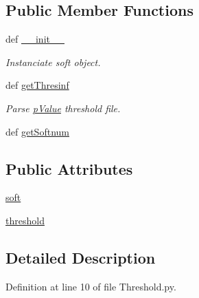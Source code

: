 \subsection*{\-Public \-Member \-Functions}
\begin{DoxyCompactItemize}
\item 
def \hyperlink{classirna_1_1iRNA__stat_1_1Threshold_1_1Threshold_ae922ba006336054553ecaad143028795}{\-\_\-\-\_\-init\-\_\-\-\_\-}
\begin{DoxyCompactList}\small\item\em \-Instanciate soft object. \end{DoxyCompactList}\item 
def \hyperlink{classirna_1_1iRNA__stat_1_1Threshold_1_1Threshold_a011bb11d170abe2252036038c2bb1b0e}{get\-Thresinf}
\begin{DoxyCompactList}\small\item\em \-Parse \hyperlink{namespaceirna_1_1iRNA__stat_1_1pValue}{p\-Value} threshold file. \end{DoxyCompactList}\item 
def \hyperlink{classirna_1_1iRNA__stat_1_1Threshold_1_1Threshold_a7006e5de74f32ce76650912800eb6a03}{get\-Softnum}
\end{DoxyCompactItemize}
\subsection*{\-Public \-Attributes}
\begin{DoxyCompactItemize}
\item 
\hyperlink{classirna_1_1iRNA__stat_1_1Threshold_1_1Threshold_af18b526a6051f08a2edab0aa5a9048be}{soft}
\item 
\hyperlink{classirna_1_1iRNA__stat_1_1Threshold_1_1Threshold_a0fa98d77361a0885579f37b537a69cb1}{threshold}
\end{DoxyCompactItemize}


\subsection{\-Detailed \-Description}


\-Definition at line 10 of file \-Threshold.\-py.



